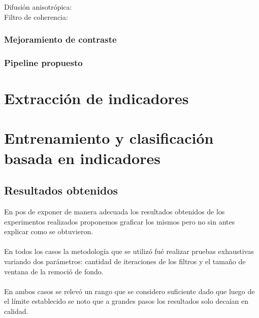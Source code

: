 \begin{description}
  \item[Difusi\'on anisotr\'opica:]
  \item[Filtro de coherencia:]
\end{description}

\subsubsection{Mejoramiento de contraste}


\subsubsection{Pipeline propuesto}


\section{Extracci\'on de indicadores}

\section{Entrenamiento y clasificaci\'on basada en indicadores}


\subsection{Resultados obtenidos}

En pos de exponer de manera adecuada los resultados obtenidos de los experimentos realizados proponemos graficar los mismos pero no sin antes explicar como se obtuvieron.
\paragraph{}
En todos los casos la metodolog\'ia que se utiliz\'o fu\'e realizar pruebas exhaustivas variando dos par\'ametros: cantidad de iteraciones de los filtros y el tamaño de ventana de la remoci\'o de fondo.
\paragraph{}
En ambos casos se relev\'o un rango que se considero suficiente dado que luego de el límite establecido se noto que a grandes pasos los resultados solo deca\'ian en calidad.

